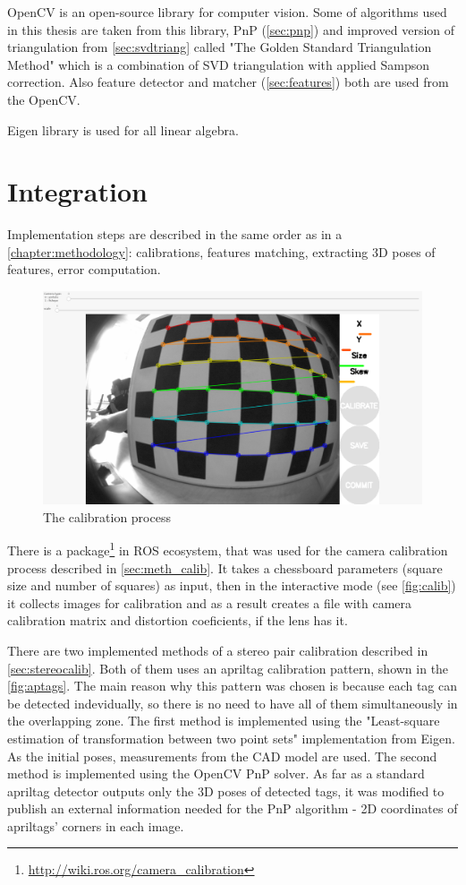 OpenCV \cite{opencv} is an open-source library for computer vision.
Some of algorithms used in this thesis are taken from this library, PnP (\autoref{sec:pnp}) and improved version of triangulation from \autoref{sec:svdtriang} called "The Golden Standard Triangulation Method" which is a combination of SVD triangulation with applied Sampson correction.
Also feature detector and matcher (\autoref{sec:features}) both are used from the OpenCV.

Eigen \cite{Eigen} library is used for all linear algebra. 

\section{Integration}
\label{sec:impl_integration}

Implementation steps are described in the same order as in a \autoref{chapter:methodology}: calibrations, features matching, extracting 3D poses of features, error computation.

\begin{figure}[h]
    \centering
    \includegraphics[width=.6\textwidth]{graphics/calibration.png}
    \caption{The calibration process}
    \label{fig:calib}
\end{figure}

There is a package\footnote{\url{http://wiki.ros.org/camera_calibration}} in ROS ecosystem, that was used for the camera calibration process described in \autoref{sec:meth_calib}. 
It takes a chessboard parameters (square size and number of squares) as input, then in the interactive mode (see \autoref{fig:calib}) it collects images for calibration and as a result creates a file with camera calibration matrix and distortion coeficients, if the lens has it.

There are two implemented methods of a stereo pair calibration described in \autoref{sec:stereocalib}.
Both of them uses an apriltag calibration pattern, shown in the \autoref{fig:aptags}.
The main reason why this pattern was chosen is because each tag can be detected indevidually, so there is no need to have all of them simultaneously in the overlapping zone.
The first method is implemented using the "Least-square estimation of transformation between two point sets" \cite{Umeyama1991} implementation from Eigen.
As the initial poses, measurements from the CAD model are used.
The second method is implemented using the OpenCV PnP solver.
As far as a standard apriltag detector outputs only the 3D poses of detected tags, it was modified to publish an external information needed for the PnP algorithm - 2D coordinates of apriltags' corners in each image.

